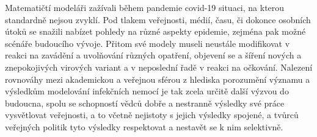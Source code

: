 Matematičtí modeláři zažívali během pandemie covid-19 situaci, na kterou standardně nejsou zvyklí. Pod tlakem veřejnosti, médií, času, či dokonce osobních útoků se snažili nabízet pohledy na různé aspekty epidemie, zejména pak možné scénáře budoucího vývoje. Přitom své modely museli neustále modifikovat v reakci na zavádění a uvolňování různých opatření, objevení se a šíření nových a znepokojivých virových variant a v neposlední řadě v reakci na očkování. Nalezení rovnováhy mezi akademickou a veřejnou sférou z hlediska porozumění významu a výsledkům modelování infekčních nemocí je tak zcela určitě další výzvou do budoucna, spolu se schopností vědců dobře a nestranně výsledky své práce vysvětlovat veřejnosti, a to včetně nejistoty s jejich výsledky spojené, a tvůrců veřejných politik tyto výsledky respektovat a nestavět se k nim selektivně.